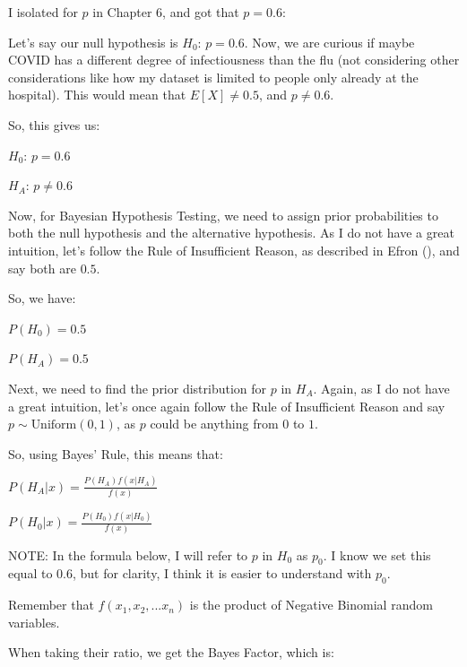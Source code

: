 \documentclass[
  letterpaper,
  DIV=11,
  numbers=noendperiod]{scrreprt}
\begin{document}
I isolated for \(p\) in Chapter 6, and got that \(p = 0.6\):

Let's say our null hypothesis is \(H_0\): \(p = 0.6\). Now, we are
curious if maybe COVID has a different degree of infectiousness than the
flu (not considering other considerations like how my dataset is limited
to people only already at the hospital). This would mean that
\(E[X] \neq 0.5\), and \(p \neq 0.6\).

So, this gives us:

\(H_0\): \(p = 0.6\)

\(H_A\): \(p \neq 0.6\)

Now, for Bayesian Hypothesis Testing, we need to assign prior
probabilities to both the null hypothesis and the alternative
hypothesis. As I do not have a great intuition, let's follow the Rule of
Insufficient Reason, as described in Efron
(), and say both are \(0.5\).

So, we have:

\(P(H_0) = 0.5\)

\(P(H_A) = 0.5\)

Next, we need to find the prior distribution for \(p\) in \(H_A\).
Again, as I do not have a great intuition, let's once again follow the
Rule of Insufficient Reason and say \(p \sim \text{Uniform}(0,1)\), as
\(p\) could be anything from \(0\) to \(1\).

So, using Bayes' Rule, this means that:

\(P(H_A|x) = \frac{P(H_A) f(x|H_A)}{f(x)}\)

\(P(H_0|x) = \frac{P(H_0) f(x|H_0)}{f(x)}\)

NOTE: In the formula below, I will refer to \(p\) in \(H_0\) as \(p_0\).
I know we set this equal to \(0.6\), but for clarity, I think it is
easier to understand with \(p_0\).

Remember that \(f(x_1,x_2,...x_n)\) is the product of Negative Binomial
random variables.

When taking their ratio, we get the Bayes Factor, which is:
\end{document}
